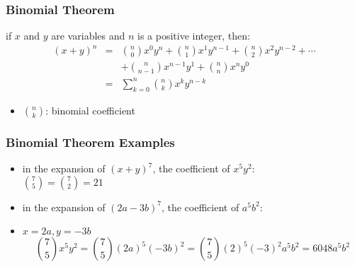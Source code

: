 \documentclass[dvipsnames]{beamer}
\begin{document}
\begin{frame}
  \frametitle{Binomial Theorem}

  \begin{theorem}
    if $x$ and $y$ are variables and $n$ is a positive integer, then:
    \begin{eqnarray*}
      (x+y)^n & = & {n\choose 0} x^0 y^n
                    + {n\choose 1} x^1 y^{n-1}
                    + {n\choose 2} x^2 y^{n-2} + \cdots\\
              &   & + {n\choose n-1} x^{n-1} y^1
                    + {n\choose n} x^n y^0 \\
              & = & \sum^n_{k=0}{{n\choose k} x^k y^{n-k}}
    \end{eqnarray*}
  \end{theorem}

  \begin{itemize}
    \item ${n\choose k}$: \alert{binomial coefficient}
  \end{itemize}
\end{frame}

\begin{frame}
  \frametitle{Binomial Theorem Examples}

  \begin{exampleblock}{}
    \begin{itemize}
      \item in the expansion of $(x+y)^7$, the coefficient of $x^5 y^2$:\\
        ${7\choose 5} = {7 \choose 2} = 21$
    \end{itemize}
  \end{exampleblock}

  \pause
  \begin{exampleblock}{}
    \begin{itemize}
      \item in the expansion of $(2a-3b)^7$, the coefficient of $a^5 b^2$:
      \item $x=2a, y=-3b$
      \begin{equation*}
      {7\choose 5} x^5 y^2 = {7\choose 5} (2a)^5 (-3b)^2
                           = {7\choose 5} (2)^5 (-3)^2 a^5 b^2 = 6048 a^5 b^2
      \end{equation*}
    \end{itemize}
  \end{exampleblock}
\end{frame}
\end{document}
